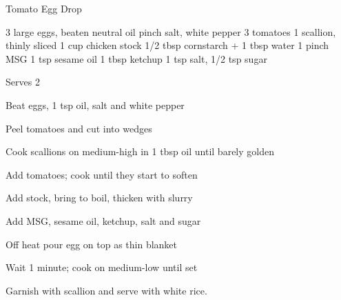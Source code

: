 \begin{denserecipe}{Tomato Egg Drop}{\vegetarian{}}
\begin{ingredients}
3 large eggs, beaten
neutral oil
pinch salt, white pepper
3 tomatoes
1 scallion, thinly sliced
1 cup chicken stock
1/2 tbsp cornstarch + 1 tbsp water
1 pinch MSG
1 tsp sesame oil
1 tbsp ketchup
1 tsp salt, 1/2 tsp sugar
\end{ingredients}
\nextcolumn
Serves 2
\begin{steps}
    \item Beat eggs, 1 tsp oil, salt and white pepper
    \item Peel tomatoes and cut into wedges
    \item Cook scallions on medium-high in 1 tbsp oil until barely golden
    \item Add tomatoes; cook until they start to soften
    \item Add stock, bring to boil, thicken with slurry
    \item Add MSG, sesame oil, ketchup, salt and sugar
    \item Off heat pour egg on top as thin blanket
    \item Wait 1 minute; cook on medium-low until set
\end{steps}
Garnish with scallion and serve with white rice.
\end{denserecipe}

